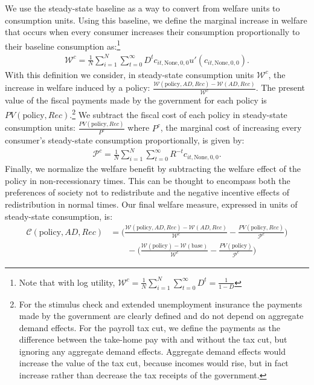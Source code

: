 \documentclass[../HAFiscal]{subfiles}
\begin{document}
We use the steady-state baseline as a way to convert from welfare units to consumption units. Using this baseline, we define the marginal increase in welfare that occurs when every consumer increases their consumption proportionally to their baseline consumption as:\footnote{Note that with log utility, $\mathcal{W}^c =\frac{1}{N}\sum_{i=1}^{N} \sum_{t=0}^{\infty} D^t = \frac{1}{1-D}$}
\begin{align}
	\mathcal{W}^c =\frac{1}{N}\sum_{i=1}^{N} \sum_{t=0}^{\infty} D^t c_{it,\text{None},0,0} u'(c_{it,\text{None},0,0}) .
\end{align}
With this definition we consider, in steady-state consumption units $\mathcal{W}^c$, the increase in welfare induced by a policy: $\frac{\mathcal{W}(\text{policy},AD,Rec)-\mathcal{W}(AD,Rec)}{\mathcal{W}^c}$. The present value of the fiscal payments made by the government for each policy is $PV(\text{policy},Rec)$.\footnote{For the stimulus check and extended unemployment insurance the payments made by the government are clearly defined and do not depend on aggregate demand effects. For the payroll tax cut, we define the payments as the difference between the take-home pay with and without the tax cut, but ignoring any aggregate demand effects. Aggregate demand effects would increase the value of the tax cut, because incomes would rise, but in fact increase rather than decrease the tax receipts of the government.} We subtract the fiscal cost of each policy in steady-state consumption units:  $\frac{PV(\text{policy},Rec)}{{P}^c}$ where ${P}^c$, the marginal cost of increasing every consumer's steady-state consumption proportionally, is given by:
\begin{align}
	\mathcal{P}^c = \frac{1}{N}\sum_{i=1}^{N} \sum_{t=0}^{\infty} R^{-t} c_{it,\text{None},0,0} .
\end{align}
Finally, we normalize the welfare benefit by subtracting the welfare effect of the policy in non-recessionary times. This can be thought to encompass both the preferences of society not to redistribute and the negative incentive effects of redistribution in normal times. Our final welfare measure, expressed in units of steady-state consumption, is:
\begin{align}
	\mathcal{C}(\text{policy},AD,Rec) &= \bigg(\frac{\mathcal{W}(\text{policy},AD,Rec)-\mathcal{W}(AD,Rec)}{\mathcal{W}^c} - \frac{PV(\text{policy},Rec)}{\mathcal{P}^c} \bigg)\\ \nonumber
	& \qquad -
	\bigg(\frac{\mathcal{W}(\text{policy}) - \mathcal{W}(\text{base})}{\mathcal{W}^c} - \frac{PV(\text{policy})}{\mathcal{P}^c} \bigg) \label{welfare_defn}
\end{align}
\end{document}
